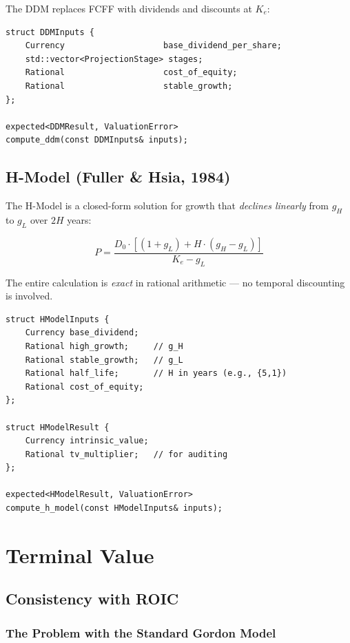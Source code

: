 \documentclass[12pt, a4paper, oneside]{book}
\newcommand{\Ke}{K_e}
\begin{document}
The DDM replaces FCFF with dividends and discounts at $\Ke$:

\begin{lstlisting}[style=cpp]
struct DDMInputs {
    Currency                    base_dividend_per_share;
    std::vector<ProjectionStage> stages;
    Rational                    cost_of_equity;
    Rational                    stable_growth;
};

expected<DDMResult, ValuationError>
compute_ddm(const DDMInputs& inputs);
\end{lstlisting}

\section{H-Model (Fuller \& Hsia, 1984)}

The H-Model is a closed-form solution for growth that \emph{declines
linearly} from $g_H$ to $g_L$ over $2H$ years:

\begin{equation}
  P = \frac{D_0 \cdot \left[(1+g_L) + H \cdot (g_H - g_L)\right]}{\Ke - g_L}
  \label{eq:hmodel}
\end{equation}

The entire calculation is \emph{exact} in rational arithmetic --- no
temporal discounting is involved.

\begin{lstlisting}[style=cpp]
struct HModelInputs {
    Currency base_dividend;
    Rational high_growth;     // g_H
    Rational stable_growth;   // g_L
    Rational half_life;       // H in years (e.g., {5,1})
    Rational cost_of_equity;
};

struct HModelResult {
    Currency intrinsic_value;
    Rational tv_multiplier;   // for auditing
};

expected<HModelResult, ValuationError>
compute_h_model(const HModelInputs& inputs);
\end{lstlisting}

\chapter{Terminal Value}

\section{Consistency with ROIC}

\subsection{The Problem with the Standard Gordon Model}
\end{document}
